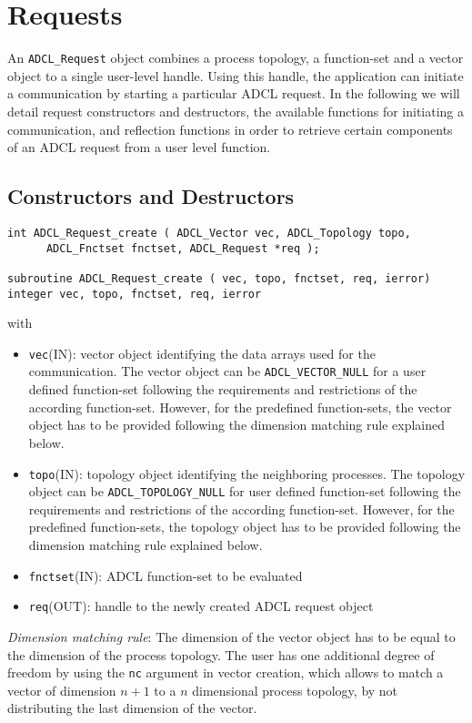 \section{Requests}

An {\tt ADCL\_Request} object  combines a process topology, a function-set and a vector object to a single user-level handle. Using this handle, the application can initiate a communication by starting a particular ADCL request. In the following we will detail request constructors and destructors, the available functions for initiating a communication, and reflection functions in order to retrieve certain components of an ADCL request from a user level function.

\subsection{Constructors and Destructors}

\begin{verbatim}
int ADCL_Request_create ( ADCL_Vector vec, ADCL_Topology topo, 
      ADCL_Fnctset fnctset, ADCL_Request *req );

subroutine ADCL_Request_create ( vec, topo, fnctset, req, ierror)
integer vec, topo, fnctset, req, ierror
\end{verbatim}
with
\begin{itemize}
\item {\tt vec}(IN): vector object identifying the data arrays used for the communication. The vector object can be {\tt ADCL\_VECTOR\_NULL} for a user defined function-set following the requirements and restrictions of the according function-set. However, for the predefined function-sets, the vector object has to be provided following the dimension matching rule explained below.
\item {\tt topo}(IN): topology object identifying the neighboring processes. The topology object can be {\tt ADCL\_TOPOLOGY\_NULL} for user defined function-set following the requirements and restrictions of the according function-set. However, for the predefined function-sets, the topology object has to be provided following the dimension matching rule explained below.
\item {\tt fnctset}(IN): ADCL function-set to be evaluated
\item {\tt req}(OUT): handle to the newly created ADCL request object
\end{itemize}
\hspace{1cm}

{\it Dimension matching rule}: The dimension of the vector object has to be equal to the dimension of the process topology. The user has one additional degree of freedom by using the {\tt nc} argument in vector creation, which allows to match a vector of dimension $n+1$ to a $n$ dimensional process topology, by not distributing the last dimension of the vector. 

